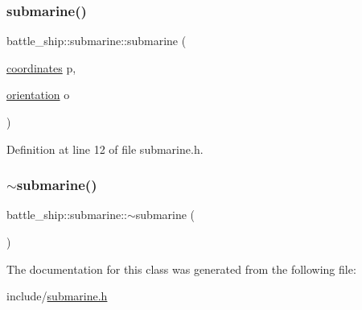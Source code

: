 \mbox{\label{classbattle__ship_1_1submarine_a229d0577e45bd964f4d32b50506c9504}} 
\subsubsection{\texorpdfstring{submarine()}{submarine()}\hspace{0.1cm}{\footnotesize\ttfamily [2/2]}}
{\footnotesize\ttfamily battle\+\_\+ship\+::submarine\+::submarine (\begin{DoxyParamCaption}\item[{\hyperlink{structbattle__ship_1_1coordinates}{coordinates}}]{p,  }\item[{\hyperlink{namespacebattle__ship_aed87488f0a73f0d0679fe343fb61c784}{orientation}}]{o }\end{DoxyParamCaption})\hspace{0.3cm}{\ttfamily [inline]}}



Definition at line 12 of file submarine.\+h.

\mbox{\label{classbattle__ship_1_1submarine_a03b3a1b0c62de507e2b3a4d9ec1de06f}} 
\subsubsection{\texorpdfstring{$\sim$submarine()}{~submarine()}}
{\footnotesize\ttfamily battle\+\_\+ship\+::submarine\+::$\sim$submarine (\begin{DoxyParamCaption}{ }\end{DoxyParamCaption})\hspace{0.3cm}{\ttfamily [default]}}



The documentation for this class was generated from the following file\+:\begin{DoxyCompactItemize}
\item 
include/\hyperlink{submarine_8h}{submarine.\+h}\end{DoxyCompactItemize}
